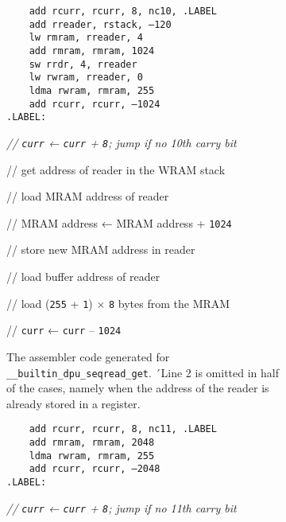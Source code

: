 \begin{figure}[t]
	\begin{subfigure}{\textwidth}
		\begin{minipage}{ \widthof{\lstinline|	add rcurr, rcurr, 8, nc10, .LABEL|} }
			\begin{lstlisting}
	add rcurr, rcurr, 8, nc10, .LABEL
	add rreader, rstack, –120
	lw rmram, rreader, 4
	add rmram, rmram, 1024
	sw rrdr, 4, rreader
	lw rwram, rreader, 0
	ldma rwram, rmram, 255
	add rcurr, rcurr, –1024
.LABEL:\end{lstlisting}
		\end{minipage}
		\hfill
		\begin{minipage}{ \widthof{// \lstinline|curr| ← \lstinline|curr| + \lstinline|8|; jump if no 10th carry bit} }
			\itshape
			// \lstinline|curr| ← \lstinline|curr| + \lstinline|8|; jump if no 10th carry bit

			// get address of reader in the \ac{WRAM} stack

			// load \ac{MRAM} address of reader

			// \ac{MRAM} address ← \ac{MRAM} address + \lstinline|1024|

			// store new \ac{MRAM} address in reader

			// load buffer address of reader

			// load (\lstinline|255| + \lstinline|1|) × \lstinline|8| bytes from the \ac{MRAM}

			// \lstinline|curr| ← \lstinline|curr| – \lstinline|1024|

			\phantom{lg}
		\end{minipage}

		\caption{
			The assembler code generated for \lstinline|__builtin_dpu_seqread_get|.
			´Line 2 is omitted in half of the cases, namely when the address of the reader is already stored in a register.
		}
		\label{fig:merge:assembler:auto}
	\end{subfigure}

	\smallskip

	\begin{subfigure}{\textwidth}
		\begin{minipage}{ \widthof{\lstinline|	add rcurr, rcurr, 8, nc10, .LABEL|} }
			\begin{lstlisting}
	add rcurr, rcurr, 8, nc11, .LABEL
	add rmram, rmram, 2048
	ldma rwram, rmram, 255
	add rcurr, rcurr, –2048
.LABEL:\end{lstlisting}
		\end{minipage}
		\hfill
		\begin{minipage}{ \widthof{// \lstinline|curr| ← \lstinline|curr| + \lstinline|8|; jump if no 10th carry bit} }
			\itshape
			// \lstinline|curr| ← \lstinline|curr| + \lstinline|8|; jump if no 11th carry bit


\end{minipage}
\end{subfigure}
\end{figure}
